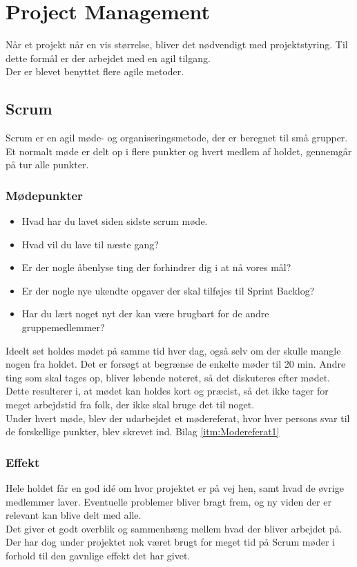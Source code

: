 \newpage
\section{Project Management}

Når et projekt når en vis størrelse, bliver det nødvendigt med projektstyring. Til dette formål er der arbejdet med en agil tilgang.\\

Der er blevet benyttet flere agile metoder.

\subsection{Scrum}

Scrum er en agil møde- og organiseringsmetode, der er beregnet til små grupper. Et normalt møde er delt op i flere punkter og hvert medlem af holdet, gennemgår på tur alle punkter.

\subsubsection{Mødepunkter}
\begin{itemize}[noitemsep]
	\item Hvad har du lavet siden sidste scrum møde.
	\item Hvad vil du lave til næste gang?
	\item Er der nogle åbenlyse ting der forhindrer dig i at nå vores mål?
	\item Er der nogle nye ukendte opgaver der skal tilføjes til Sprint Backlog?
	\item Har du lært noget nyt der kan være brugbart for de andre gruppemedlemmer?
\end{itemize}

Ideelt set holdes mødet på samme tid hver dag, også selv om der skulle mangle nogen fra holdet.
Det er forsøgt at begrænse de enkelte møder til 20 min. Andre ting som skal tages op, bliver løbende noteret, så det diskuteres efter mødet. Dette resulterer i, at mødet kan holdes kort og præcist, så det ikke tager for meget arbejdstid fra folk, der ikke skal bruge det til noget.\\

Under hvert møde, blev der udarbejdet et mødereferat, hvor hver persons svar til de forskellige punkter, blev skrevet ind. Bilag \ref{itm:Modereferat1}


\subsubsection{Effekt}
Hele holdet får en god idé om hvor projektet er på vej hen, samt hvad de øvrige medlemmer laver.
Eventuelle problemer bliver bragt frem, og ny viden der er relevant kan blive delt med alle.\\
Det giver et godt overblik og sammenhæng mellem hvad der bliver arbejdet på. Der har dog under projektet nok været brugt for meget tid på Scrum møder i forhold til den gavnlige effekt det har givet.


